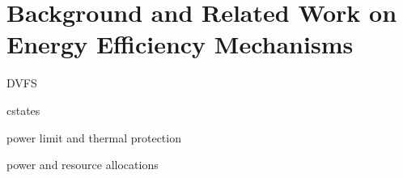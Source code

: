 \chapter{Background and Related Work on Energy Efficiency Mechanisms}
\label{sec:background}

DVFS

cstates

power limit and thermal protection

power and resource allocations






